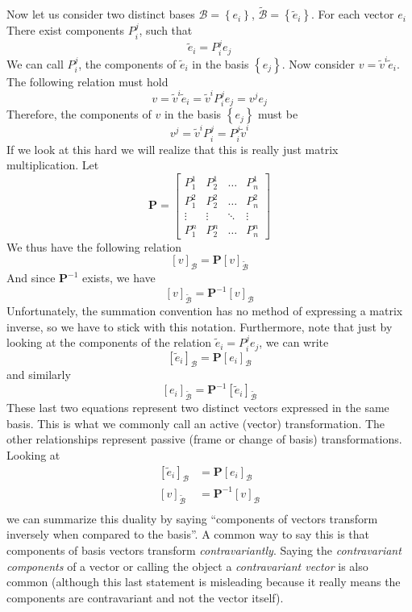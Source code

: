 \documentclass[a4paper]{article}
\begin{document}
Now let us consider two distinct bases $\mathcal{B} = \left\{ e_i \right\}$, $\widetilde{\mathcal{B}} = \left\{ \tilde{e}_i \right\}$. For each vector $e_i$ There exist components $P_i^j$, such that
\[
  \tilde{e}_i = P_i^j e_j
\]
We can call $P_i^j$, the components of $\tilde{e}_i$ in the basis $\left\{e_j\right\}$. Now consider $v = \tilde{v}^i \tilde{e}_i$. The following relation must hold
\[
  v = \tilde{v}^i \tilde{e}_i = \tilde{v}^i P_i^j e_j = v^j e_j
\]
Therefore, the components of $v$ in the basis $ \left\{ e_j \right\}$ must be
\[
  v^j = \tilde{v}^i P_i^j = P_i^j \tilde{v}^i
\]
If we look at this hard we will realize that this is really just matrix multiplication. Let
\[
  \bm{P} = 
  \begin{bmatrix}
    P_1^1 & P_2^1 & \dots & P_n^1 \\
    P_1^2 & P_2^2 & \dots & P_n^2 \\
    \vdots & \vdots & \ddots & \vdots \\
    P_1^n & P_2^n & \dots & P_n^n
  \end{bmatrix}
\]
We thus have the following relation
\[
  \left[ v \right]_{\mathcal{B}} = \bm{P} \left[ v \right]_{\widetilde{\mathcal{B}}}
\]
And since $\bm{P}^{-1}$ exists, we have
\[
  \left[ v \right]_{\widetilde{\mathcal{B}}} = \bm{P}^{-1} \left[ v \right]_{\mathcal{B}}
\]
Unfortunately, the summation convention has no method of expressing a matrix inverse, so we have to stick with this notation. Furthermore, note that just by looking at the components of the relation $\tilde{e}_i = P_i^j e_j$, we can write
\[
  \left[ \tilde{e}_i \right]_{\mathcal{B}} = \bm{P} \left[ e_i \right]_{\mathcal{B}}
\]
and similarly
\[
  \left[ e_i \right]_{\widetilde{\mathcal{B}}} = \bm{P}^{-1} \left[ \tilde{e}_i \right]_{\widetilde{\mathcal{B}}} 
\]
These last two equations represent two distinct vectors expressed in the same basis. This is what we commonly call an active (vector) transformation. The other relationships represent passive (frame or change of basis) transformations. Looking at 
\[
\begin{aligned}
  \left[ \tilde{e}_i \right]_{\mathcal{B}} &= \bm{P} \left[ e_i \right]_{\mathcal{B}} \\
  \left[ v \right]_{\widetilde{\mathcal{B}}} &= \bm{P}^{-1} \left[ v \right]_{\mathcal{B}} \\
\end{aligned}
\]
we can summarize this duality by saying ``components of vectors transform inversely when compared to the basis''. A common way to say this is that components of basis vectors transform \textit{contravariantly}. Saying the \textit{contravariant components} of a vector or calling the object a \textit{contravariant vector} is also common (although this last statement is misleading because it really means the components are contravariant and not the vector itself).
\end{document}
